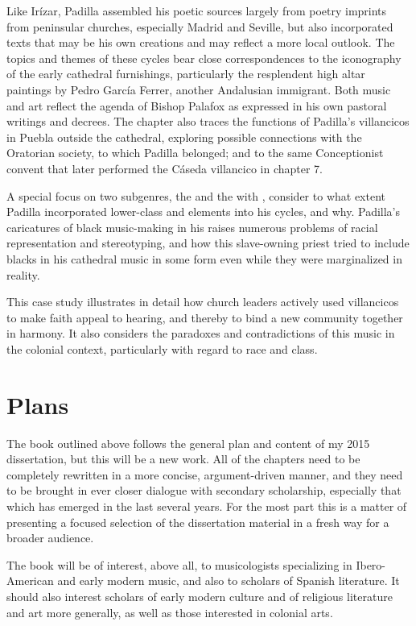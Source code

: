 \documentclass[tt]{vcbook-proposal}
\begin{document}
Like Irízar, Padilla assembled his poetic sources largely from poetry imprints from peninsular churches, especially Madrid and Seville, but also incorporated texts that may be his own creations and may reflect a more local outlook.
The topics and themes of these cycles bear close correspondences to the iconography of the early cathedral furnishings, particularly the resplendent high altar paintings by Pedro García Ferrer, another Andalusian immigrant.
Both  music and art reflect the agenda of Bishop Palafox as expressed in his own pastoral writings and decrees.
The chapter also traces the functions of Padilla's villancicos in Puebla outside the cathedral, exploring possible connections with the Oratorian society, to which Padilla belonged; and to the same Conceptionist convent that later performed the Cáseda villancico in chapter 7.

A special focus on two subgenres, the  and the  with , consider to what extent Padilla incorporated lower-class and  elements into his cycles, and why.
Padilla's caricatures of black music-making in his  raises numerous problems of racial representation and stereotyping, and how this slave-owning priest tried to include blacks in his cathedral music in some form even while they were marginalized in reality.

This case study illustrates in detail how church leaders actively used villancicos to make faith appeal to hearing, and thereby to bind a new community together in harmony.
It also considers the paradoxes and contradictions of this music in the colonial context, particularly with regard to race and class.

\section{Plans}

The book outlined above follows the general plan and content of my 2015 dissertation, but this will be a new work.
All of the chapters need to be completely rewritten in a more concise, argument-driven manner, and they need to be brought in ever closer dialogue with secondary scholarship, especially that which has emerged in the last several years.
For the most part this is a matter of presenting a focused selection of the dissertation material in a fresh way for a broader audience.

The book will be of interest, above all, to musicologists specializing in Ibero-American and early modern music, and also to scholars of Spanish literature.
It should also interest scholars of early modern culture and of religious literature and art more generally, as well as those interested in colonial arts.
\end{document}
